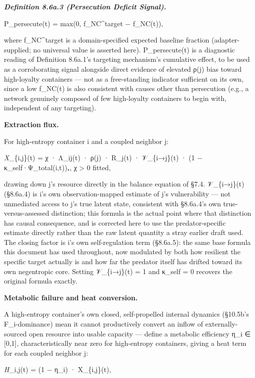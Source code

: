 \documentclass[
]{article}
\begin{document}
\emph{\textbf{Definition 8.6a.3 (Persecution Deficit Signal).}}

P\_persecute(t) = max(0, f\_NC\^{}target − f\_NC(t)),

where f\_NC\^{}target is a domain-specified expected baseline fraction
(adapter-supplied; no universal value is asserted here). P\_persecute(t)
is a diagnostic reading of Definition 8.6a.1's targeting mechanism's
cumulative effect, to be used as a corroborating signal alongside direct
evidence of elevated ρ(j) bias toward high-loyalty containers --- not as
a free-standing indicator sufficient on its own, since a low f\_NC(t) is
also consistent with causes other than persecution (e.g., a network
genuinely composed of few high-loyalty containers to begin with,
independent of any targeting).

\textbf{Extraction flux.}

For high-entropy container i and a coupled neighbor j:

\emph{X}\_\{i,j\}(t) = χ · Λ\_ij(t) · ρ(j) · R\_j(t) · 𝒱\_\{i→j\}(t) ·
(1 − κ\_self·Ψ\_total(i,t))₊, χ \textgreater{} 0 fitted,

drawing down j's resource directly in the balance equation of §7.4.
𝒱\_\{i→j\}(t) (§8.6a.4) is i's own observation-mapped estimate of j's
vulnerability --- not unmediated access to j's true latent state,
consistent with §8.6a.4's own true-versus-assessed distinction; this
formula is the actual point where that distinction has causal
consequence, and is corrected here to use the predator-specific estimate
directly rather than the raw latent quantity a stray earlier draft used.
The closing factor is i's own self-regulation term (§8.6a.5): the same
base formula this document has used throughout, now modulated by both
how resilient the specific target actually is and how far the predator
itself has drifted toward its own negentropic core. Setting
𝒱\_\{i→j\}(t) = 1 and κ\_self = 0 recovers the original formula exactly.

\textbf{Metabolic failure and heat conversion.}

A high-entropy container's own closed, self-propelled internal dynamics
(§10.5b's F\_i-dominance) mean it cannot productively convert an inflow
of externally-sourced open resource into usable capacity --- define a
metabolic efficiency η\_i ∈ {[}0,1{]}, characteristically near zero for
high-entropy containers, giving a heat term for each coupled neighbor j:

\emph{H}\_i,j(t) = (1 − η\_i) · X\_\{i,j\}(t),
\end{document}
